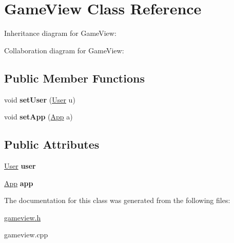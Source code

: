 \hypertarget{classGameView}{}\section{Game\+View Class Reference}
\label{classGameView}


Inheritance diagram for Game\+View\+:


Collaboration diagram for Game\+View\+:
\subsection*{Public Member Functions}
\begin{DoxyCompactItemize}
\item 
\mbox{\label{classGameView_a7f4a377f7924b7adfe0bfbd128f5ae0e}} 
void {\bfseries set\+User} (\hyperlink{classUser}{User} u)
\item 
\mbox{\label{classGameView_a1b9cd29be55c2ac4c9ceab49e3e33388}} 
void {\bfseries set\+App} (\hyperlink{classApp}{App} a)
\end{DoxyCompactItemize}
\subsection*{Public Attributes}
\begin{DoxyCompactItemize}
\item 
\mbox{\label{classGameView_ac86c5e08e929d726367be34e457953ad}} 
\hyperlink{classUser}{User} {\bfseries user}
\item 
\mbox{\label{classGameView_a95cf36efdc7b024f55878ef57e40b4c5}} 
\hyperlink{classApp}{App} {\bfseries app}
\end{DoxyCompactItemize}


The documentation for this class was generated from the following files\+:\begin{DoxyCompactItemize}
\item 
\hyperlink{gameview_8h}{gameview.\+h}\item 
gameview.\+cpp\end{DoxyCompactItemize}
